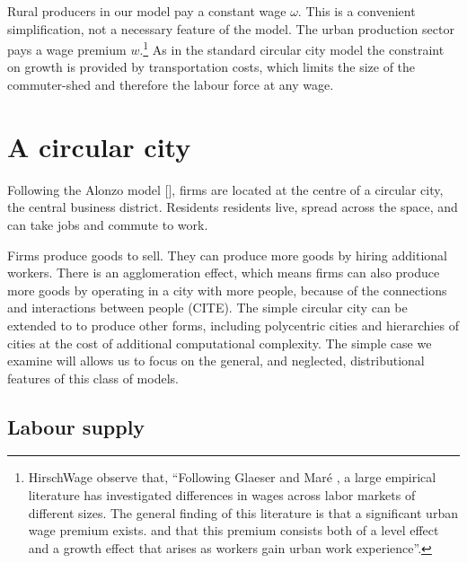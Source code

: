 Rural producers in our model pay a constant wage $\omega$. This is a convenient simplification, not a necessary feature of the model. The urban production sector pays a wage premium $w$.\footnote{
HirschWage \cite{hirschUrbanWagePremium2019} observe that, ``Following Glaeser and Maré \cite{glaeserCitiesSkills2001},  a  large  empirical  literature  has  investigated differences in wages across labor markets of different sizes. The general finding of this literature is that a significant urban wage premium exists. and that this premium consists both of a level effect and a growth effect that arises as workers gain urban work experience''. } As in the standard circular city model the constraint on growth is provided by transportation costs, which limits the size of the commuter-shed and therefore the labour force at any wage. 



\section{A circular city}

Following the Alonzo model [], firms are located at the centre of a circular city, the central business district. Residents residents live, spread across the space, and can take jobs and commute to work.

Firms produce goods to sell. They can produce more goods by hiring additional workers. 
There is an agglomeration effect, which means firms can also produce more goods by operating in a city with more people, because of the connections and interactions between people (CITE). 
The simple circular city can be extended to to produce other forms, including polycentric cities and hierarchies of cities at the cost of additional computational complexity. The simple case we examine will allows us to focus on the general, and neglected, distributional features of this class of models.

\subsection{Labour supply}


